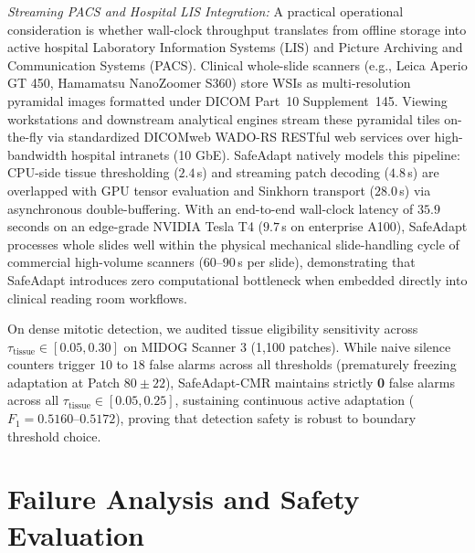 \documentclass[journal]{IEEEtran}
\begin{document}
\textit{Streaming PACS and Hospital LIS Integration:} A practical operational consideration is whether wall-clock throughput translates from offline storage into active hospital Laboratory Information Systems (LIS) and Picture Archiving and Communication Systems (PACS). Clinical whole-slide scanners (e.g., Leica Aperio GT 450, Hamamatsu NanoZoomer S360) store WSIs as multi-resolution pyramidal images formatted under DICOM Part~10 Supplement~145. Viewing workstations and downstream analytical engines stream these pyramidal tiles on-the-fly via standardized DICOMweb WADO-RS RESTful web services over high-bandwidth hospital intranets (10 GbE). SafeAdapt natively models this pipeline: CPU-side tissue thresholding ($2.4$\,s) and streaming patch decoding ($4.8$\,s) are overlapped with GPU tensor evaluation and Sinkhorn transport ($28.0$\,s) via asynchronous double-buffering. With an end-to-end wall-clock latency of $35.9$\,seconds on an edge-grade NVIDIA Tesla T4 ($9.7$\,s on enterprise A100), SafeAdapt processes whole slides well within the physical mechanical slide-handling cycle of commercial high-volume scanners (60--90\,s per slide), demonstrating that SafeAdapt introduces zero computational bottleneck when embedded directly into clinical reading room workflows.

On dense mitotic detection, we audited tissue eligibility sensitivity across $\tau_{\text{tissue}} \in [0.05, 0.30]$ on MIDOG Scanner 3 (1,100 patches). While naive silence counters trigger $10$ to $18$ false alarms across all thresholds (prematurely freezing adaptation at Patch $80 \pm 22$), SafeAdapt-CMR maintains strictly \textbf{0} false alarms across all $\tau_{\text{tissue}} \in [0.05, 0.25]$, sustaining continuous active adaptation ($F_1 = 0.5160$--$0.5172$), proving that detection safety is robust to boundary threshold choice.

\section{Failure Analysis and Safety Evaluation}
\end{document}
